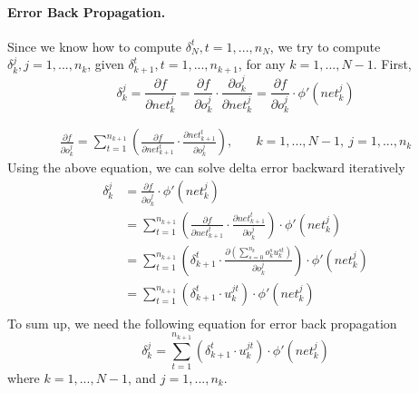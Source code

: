 \paragraph{Error Back Propagation.}
Since we know how to compute $\delta_N^t, t = 1,...,n_N$, we try to compute $\delta_{k}^j, j = 1,...,n_{k}$, given $\delta_{k+1}^t, t = 1,...,n_{k+1}$, for any $k = 1,...,N-1$.
First,
\[
    \delta_{k}^j
    = \frac{\partial f}{\partial \mathit{net}_{k}^j}
    = \frac{\partial f}{\partial o_{k}^j} \cdot \frac{\partial o_{k}^j}{\partial \mathit{net}_{k}^j}
    = \frac{\partial f}{\partial o_{k}^j} \cdot \phi'(\mathit{net}_{k}^j)
\]

\[\begin{alignedat}{5}
    \frac{\partial f}{\partial o_{k}^j} = \sum_{t=1}^{n_{k+1}} \left( \frac{\partial f}{\partial \mathit{net}_{k+1}^t} \cdot \frac{\partial \mathit{net}_{k+1}^t}{\partial o_{k}^j} \right),
    &\quad k = 1,...,N-1, \: j = 1,...,n_{k}
\end{alignedat}\]
Using the above equation, we can solve delta error backward iteratively
\[\begin{aligned}
    \delta_{k}^j
    &= \frac{\partial f}{\partial o_{k}^j} \cdot \phi'(\mathit{net}_{k}^j) \\
    &= \sum_{t=1}^{n_{k+1}} \left( \frac{\partial f}{\partial \mathit{net}_{k+1}^t} \cdot \frac{\partial \mathit{net}_{k+1}^t}{\partial o_{k}^j} \right) \cdot \phi'(\mathit{net}_{k}^j) \\
    &= \sum_{t=1}^{n_{k+1}} \left( \delta_{k+1}^t \cdot \frac{\partial \left( \sum_{s=0}^{n_{k}} o_{k}^s u_{k}^{st} \right) }{\partial o_{k}^j} \right) \cdot \phi'(\mathit{net}_{k}^j) \\
    &= \sum_{t=1}^{n_{k+1}} \left( \delta_{k+1}^t \cdot u_{k}^{jt} \right) \cdot \phi'(\mathit{net}_{k}^j) \\
\end{aligned}\]
To sum up, we need the following equation for error back propagation
\[\boxed{\delta_{k}^j = \sum_{t=1}^{n_{k+1}} \left( \delta_{k+1}^t \cdot u_{k}^{jt} \right) \cdot \phi'(\mathit{net}_{k}^j)}\]
where $k = 1,...,N-1$, and $j = 1,...,n_{k}$.

